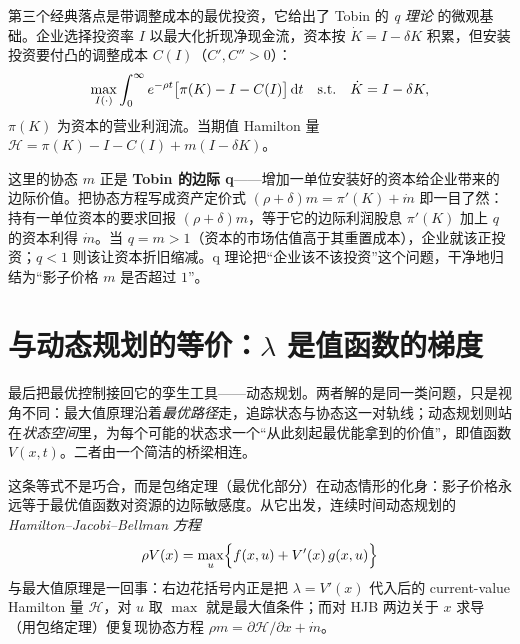 第三个经典落点是带调整成本的最优投资，它给出了 Tobin 的 \emph{q 理论} 的微观基础。企业选择投资率 $I$ 以最大化折现净现金流，资本按 $\dot K=I-\delta K$ 积累，但安装投资要付凸的调整成本 $C(I)$（$C',C''>0$）：
\[
    \max_{I(\cdot)}\int_0^\infty e^{-\rho t}\bigl[\pi(K)-I-C(I)\bigr]\mathop{}\!\mathrm{d} t
    \quad\text{s.t.}\quad
    \dot K=I-\delta K ,
\]
$\pi(K)$ 为资本的营业利润流。当期值 Hamilton 量 $\mathcal H=\pi(K)-I-C(I)+m(I-\delta K)$。


这里的协态 $m$ 正是 \textbf{Tobin 的边际 q}——增加一单位安装好的资本给企业带来的边际价值。把协态方程写成资产定价式 $(\rho+\delta)m=\pi'(K)+\dot m$ 即一目了然：持有一单位资本的要求回报 $(\rho+\delta)m$，等于它的边际利润股息 $\pi'(K)$ 加上 $q$ 的资本利得 $\dot m$。当 $q=m>1$（资本的市场估值高于其重置成本），企业就该正投资；$q<1$ 则该让资本折旧缩减。q 理论把``企业该不该投资''这个问题，干净地归结为``影子价格 $m$ 是否超过 $1$''。

\section{与动态规划的等价：$\lambda$ 是值函数的梯度}
\label{sec:optcontrol-8}

最后把最优控制接回它的孪生工具——动态规划。两者解的是同一类问题，只是视角不同：最大值原理沿着\emph{最优路径}走，追踪状态与协态这一对轨线；动态规划则站在\emph{状态空间}里，为每个可能的状态求一个``从此刻起最优能拿到的价值''，即值函数 $V(x,t)$。二者由一个简洁的桥梁相连。


这条等式不是巧合，而是包络定理（最优化部分）在动态情形的化身：影子价格永远等于最优值函数对资源的边际敏感度。从它出发，连续时间动态规划的 \emph{Hamilton--Jacobi--Bellman 方程}
\[
    \rho V(x)=\max_u\Bigl\{f(x,u)+V'(x)\,g(x,u)\Bigr\}
\]
与最大值原理是一回事：右边花括号内正是把 $\lambda=V'(x)$ 代入后的 current-value Hamilton 量 $\mathcal H$，对 $u$ 取 $\max$ 就是最大值条件；而对 HJB 两边关于 $x$ 求导（用包络定理）便复现协态方程 $\rho m=\partial\mathcal H/\partial x+\dot m$。


